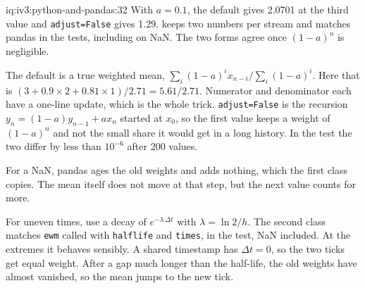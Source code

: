 \begin{solution}{iq:iv3:python-and-pandas:32}
With $a = 0.1$, the default gives 2.0701 at the third value and \texttt{adjust=False} gives 1.29.  keeps two numbers per stream and matches pandas in the tests, including on NaN. The two forms agree once $(1 - a)^n$ is negligible.
\label{lst:iv3:pp:ewma}

The default is a true weighted mean, $\sum_i (1 - a)^i x_{n-i} / \sum_i (1 - a)^i$. Here that is $(3 + 0.9 \times 2 + 0.81 \times 1) / 2.71 = 5.61 / 2.71$. Numerator and denominator each have a one-line update, which is the whole trick. \texttt{adjust=False} is the recursion $y_n = (1 - a) y_{n-1} + a x_n$ started at $x_0$, so the first value keeps a weight of $(1 - a)^n$ and not the small share it would get in a long history. In the test the two differ by less than $10^{-6}$ after 200 values.

For a NaN, pandas ages the old weights and adds nothing, which the first class copies. The mean itself does not move at that step, but the next value counts for more.

For uneven times, use a decay of $e^{-\lambda \, \Delta t}$ with $\lambda = \ln 2 / h$. The second class matches \texttt{ewm} called with \texttt{halflife} and \texttt{times}, in the test, NaN included. At the extremes it behaves sensibly. A shared timestamp has $\Delta t = 0$, so the two ticks get equal weight. After a gap much longer than the half-life, the old weights have almost vanished, so the mean jumps to the new tick.

\end{solution}

